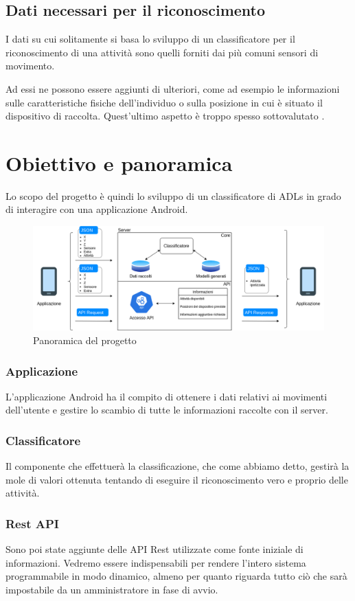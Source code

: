 \subsection{Dati necessari per il riconoscimento}
I dati su cui solitamente si basa lo sviluppo di un classificatore per il riconoscimento di una attività sono quelli forniti dai 
più comuni sensori di movimento.

Ad essi ne possono essere aggiunti di ulteriori, come ad esempio le informazioni sulle caratteristiche fisiche
dell'individuo o sulla posizione in cui è situato il dispositivo di raccolta.
Quest'ultimo aspetto è troppo spesso sottovalutato \cite{umafall}.



\section{Obiettivo e panoramica}
Lo scopo del progetto è quindi lo sviluppo di un classificatore di ADLs in grado di interagire con una applicazione
Android.

\begin{figure}[H]
    \centering
    \includegraphics[scale = 0.41]{assets/images/overview.png}
    \caption{Panoramica del progetto}
\end{figure}

\subsubsection{Applicazione}
L'applicazione Android ha il compito di ottenere i dati relativi ai movimenti dell'utente 
e gestire lo scambio di tutte le informazioni raccolte con il server.
\subsubsection{Classificatore}
Il componente che effettuerà la classificazione, che come abbiamo detto, gestirà la mole di valori ottenuta tentando di 
eseguire il riconoscimento vero e proprio delle attività.
\subsubsection{Rest API}
Sono poi state aggiunte delle API Rest utilizzate come fonte iniziale di informazioni. Vedremo essere indispensabili 
per rendere l'intero sistema programmabile in modo dinamico, almeno per quanto riguarda tutto ciò che sarà impostabile 
da un amministratore in fase di avvio.